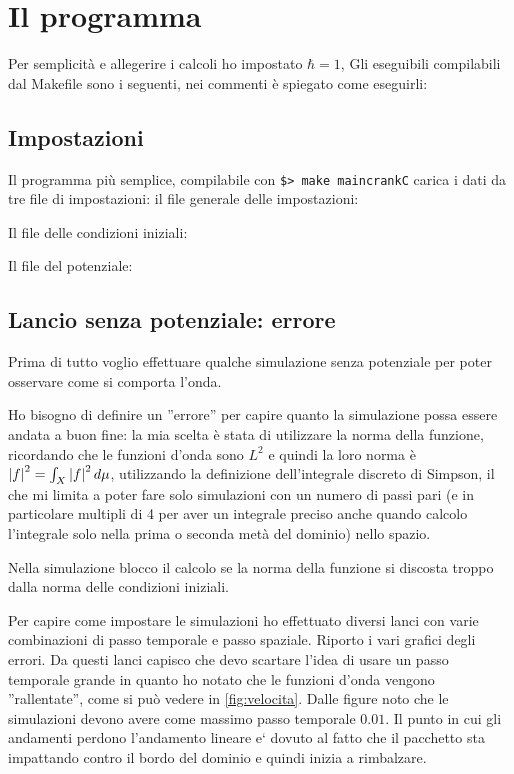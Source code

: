 \section{Il programma}
Per semplicit\`a e allegerire i calcoli ho impostato $\hbar=1$, 
Gli eseguibili compilabili dal Makefile sono i seguenti, nei commenti \`e spiegato come eseguirli:

\subsection{Impostazioni}
Il programma pi\`u semplice, compilabile con \lstinline|$> make maincrankC| carica i dati da tre file di impostazioni:
il file generale delle impostazioni:

Il file delle condizioni iniziali:

Il file del potenziale:

\subsection{Lancio senza potenziale: errore}
Prima di tutto voglio effettuare qualche simulazione senza potenziale per poter osservare come si comporta l'onda.

Ho bisogno di definire un ''errore'' per capire quanto la simulazione possa essere andata a buon fine:
la mia scelta \`e stata di utilizzare la norma della funzione, ricordando che le funzioni d'onda sono $L^2$ e quindi la loro norma \`e  $\lr||f^2=\int_X\lr||f^2d\mu$, utilizzando la definizione dell'integrale discreto di Simpson, il che mi limita a poter fare solo simulazioni con un numero di passi pari (e in particolare multipli di 4 per aver un integrale preciso anche quando calcolo l'integrale solo nella prima o seconda met\`a del dominio) nello spazio.

Nella simulazione blocco il calcolo se la norma della funzione si discosta troppo dalla norma delle condizioni iniziali.

Per capire come impostare le simulazioni ho effettuato diversi lanci con varie combinazioni di passo temporale e passo spaziale. Riporto i vari grafici degli errori.
Da questi lanci capisco che devo scartare l'idea di usare un passo temporale grande in quanto ho notato che le funzioni d'onda vengono ''rallentate'', come si pu\`o vedere in \autoref{fig:velocita}. Dalle figure noto che le simulazioni devono avere come massimo passo temporale $0.01$. Il punto in cui gli andamenti perdono l'andamento lineare e` dovuto al fatto che il pacchetto sta impattando contro il bordo del dominio e quindi inizia a rimbalzare.

